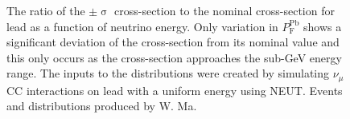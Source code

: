 \begin{figure}%
  \centering
  \caption{The ratio of the $\pm$$\upsigma$ cross-section to the nominal cross-section for lead as a function of neutrino energy.  Only variation in $P_{\textrm{F}}^{\textrm{Pb}}$ shows a significant deviation of the cross-section from its nominal value and this only occurs as the cross-section approaches the sub-GeV energy range.  The inputs to the distributions  were created by simulating $\nu_\mu$ CC interactions on lead with a uniform energy using NEUT.  Events and distributions produced by W. Ma.}
  \label{fig:PbXSecRatios}
\end{figure}
